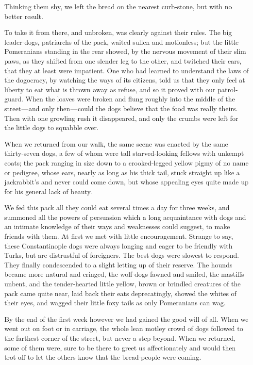 \documentclass[12pt]{book}
\begin{document}
Thinking them shy, we left the bread on the nearest curb‐stone, but with no
better result.

To take it from there, and unbroken, was clearly against their rules. The big
leader‐dogs, patriarchs of the pack, waited sullen and motionless; but the little
Pomeranians standing in the rear showed, by the nervous movement of their
slim paws, as they shifted from one slender leg to the other, and twitched their
ears, that they at least were impatient. One who had learned to understand the
laws of the dogocracy, by watching the ways of its citizens, told us that they only
feel at liberty to eat what is thrown away as refuse, and so it proved with our
patrol‐guard. When the loaves were broken and flung roughly into the middle of
the street — and only then — could the dogs believe that the food was really theirs.
Then with one growling rush it disappeared, and only the crumbs were left for
the little dogs to squabble over.

When we returned from our walk, the same scene was enacted by the same
thirty‐seven dogs, a few of whom were tall starved‐looking fellows with unkempt
coats; the pack ranging in size down to a crooked‐legged yellow pigmy of no
name or pedigree, whose ears, nearly as long as his thick tail, stuck straight up
like a jackrabbit’s and never could come down, but whose appealing eyes quite
made up for his general lack of beauty.

We fed this pack all they could eat several times a day for three weeks, and
summoned all the powers of persuasion which a long acquaintance with dogs
and an intimate knowledge of their ways and weaknesses could suggest, to make
friends with them. At first we met with little encouragement. Strange to say,
these Constantinople dogs were always longing and eager to be friendly with
Turks, but are distrustful of foreigners. The best dogs were slowest to respond.
They finally condescended to a slight letting up of their reserve. The hounds
became more natural and cringed, the wolf‐dogs fawned and smiled, the mastiffs
unbent, and the tender‐hearted little yellow, brown or brindled creatures of the
pack came quite near, laid back their eats deprecatingly, showed the whites of
their eyes, and wagged their little foxy tails as only Pomeranians can wag.

By the end of the first week however we had gained the good will of all. When
we went out on foot or in carriage, the whole lean motley crowd of dogs followed
to the farthest corner of the street, but never a step beyond. When we returned,
some of them were, sure to be there to greet us affectionately and would then trot
off to let the others know that the bread‐people were coming.
\end{document}

